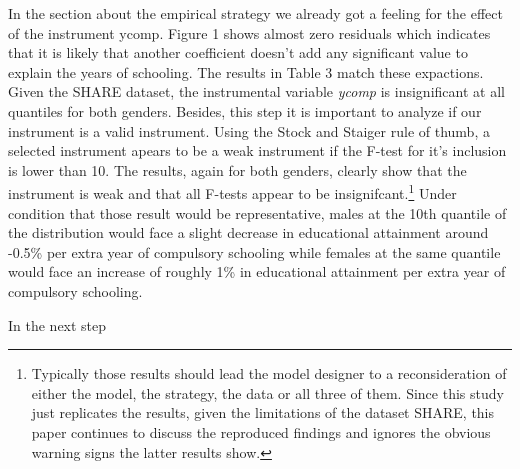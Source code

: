 \documentclass[12pt,a4paper]{article}
\let\rmarkdownfootnote\footnote%
\def\footnote{\protect\rmarkdownfootnote}
\begin{document}
In the section about the empirical strategy we already got a feeling for
the effect of the instrument ycomp. Figure 1 shows almost zero residuals
which indicates that it is likely that another coefficient doesn't add
any significant value to explain the years of schooling. The results in
Table 3 match these expactions. Given the SHARE dataset, the
instrumental variable \textit{ycomp} is insignificant at all quantiles
for both genders. Besides, this step it is important to analyze if our
instrument is a valid instrument. Using the Stock and Staiger rule of
thumb, a selected instrument apears to be a weak instrument if the
F-test for it's inclusion is lower than 10. The results, again for both
genders, clearly show that the instrument is weak and that all F-tests
appear to be insignifcant.\footnote{Typically those results should lead
  the model designer to a reconsideration of either the model, the
  strategy, the data or all three of them. Since this study just
  replicates the results, given the limitations of the dataset SHARE,
  this paper continues to discuss the reproduced findings and ignores
  the obvious warning signs the latter results show.} Under condition
that those result would be representative, males at the 10th quantile of
the distribution would face a slight decrease in educational attainment
around -0.5\% per extra year of compulsory schooling while females at
the same quantile would face an increase of roughly 1\% in educational
attainment per extra year of compulsory schooling.

In the next step
\end{document}

